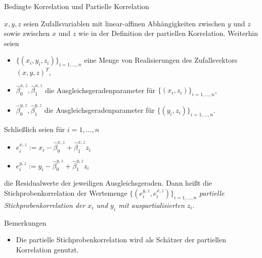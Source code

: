 \documentclass[
  8pt,
  ignorenonframetext,
]{beamer}
\providecommand{\tightlist}{%
  \setlength{\itemsep}{0pt}\setlength{\parskip}{0pt}}
\begin{document}
\begin{frame}{Bedingte Korrelation und Partielle Korrelation}
\protect\hypertarget{bedingte-korrelation-und-partielle-korrelation-7}{}
\footnotesize
\begin{definition}
\justifying
$x,y,z$ seien Zufallsvariablen mit linear-affinen Abhängigkeiten zwischen
$y$ und $z$ sowie zwischen $x$ und $z$ wie in der Definition der partiellen
Korrelation. Weiterhin seien
\begin{itemize}
\item $\{(x_i,y_i,z_i)\}_{i = 1,...,n}$  eine Menge von Realisierungen des Zufallsvektors $(x,y,z)^T$,
\item $\hat{\beta}_0^{x,z}, \hat{\beta}_1^{x,z}$ die Ausgleichsgeradenparameter für $\{(x_i,z_i)\}_{i = 1,...,n}$,
\item $\hat{\beta}_0^{y,z}, \hat{\beta}_1^{y,z}$ die Ausgleichsgeradenparameter für $\{(y_i,z_i)\}_{i = 1,...,n}$.
\end{itemize}
Schließlich seien für $i = 1,...,n$
\begin{itemize}
\item $e^{x,z}_i := x_i - \hat{\beta}_0^{x,z} + \hat{\beta}_1^{x,z}z_i$
\item $e^{y,z}_i := y_i - \hat{\beta}_0^{y,z} + \hat{\beta}_1^{y,z}z_i$
\end{itemize}
die Residualwerte der jeweiligen Ausgleichsgeraden. Dann heißt die Stichprobenkorrelation
der Wertemenge $\{(e^{y,z}_i,e^{x,z}_i)\}_{i = 1,...,n}$
\textit{partielle Stichprobenkorrelation der $x_i$ und $y_i$ mit auspartialisierten $z_i$}.
\end{definition}

Bemerkungen

\begin{itemize}
\tightlist
\item
  Die partielle Stichprobenkorrelation wird als Schätzer der partiellen
  Korrelation genutzt.
\end{itemize}
\end{frame}
\end{document}

